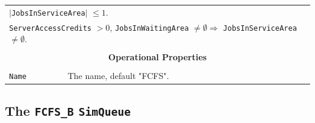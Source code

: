 \documentclass[12pt]{book}
\begin{document}
\begin{tabular}{|l|l|l|l|}
\multicolumn{4}{|l|}{$|$\lstinline|JobsInServiceArea|$|$ $\leq 1$.} \\
\multicolumn{4}{|l|}{\lstinline|ServerAccessCredits| $> 0$, \lstinline|JobsInWaitingArea| $\neq \emptyset
                     \Rightarrow$ \lstinline|JobsInServiceArea| $\neq \emptyset$.} \\
\hline
\multicolumn{4}{|c|}{} \\
\multicolumn{4}{|c|}{\bf Operational Properties} \\
\multicolumn{4}{|c|}{} \\
\hline
\lstinline|Name| & \multicolumn{3}{|l|}{The name, default "FCFS".} \\
\hline
\end{tabular}

\subsection{The \lstinline{FCFS_B} \lstinline{SimQueue}}
\label{sec:FCFS_B}
\end{document}

